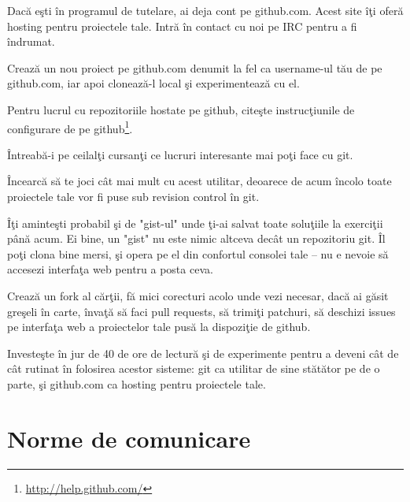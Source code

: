 \begin{Exercise}[title={A taste of git}]
Dacă eşti în programul de tutelare, ai deja cont pe github.com.
Acest site îţi oferă hosting pentru proiectele tale. Intră
în contact cu noi pe IRC pentru a fi îndrumat.

Crează un nou proiect pe github.com denumit la fel ca username-ul
tău de pe github.com, iar apoi clonează-l local şi experimentează
cu el.

Pentru lucrul cu repozitoriile hostate pe github, citeşte instrucţiunile
de configurare de pe github\footnote{\url{http://help.github.com/}}.

Întreabă-i pe ceilalţi cursanţi ce lucruri interesante mai poţi face
cu git.

Încearcă să te joci cât mai mult cu acest utilitar, deoarece de acum
încolo toate proiectele tale vor fi puse sub revision control în git.

Îţi aminteşti probabil şi de "gist-ul" unde ţi-ai salvat toate soluţiile
la exerciţii până acum. Ei bine, un "gist" nu este nimic altceva decât
un repozitoriu git. Îl poţi clona bine mersi, şi opera pe el
din confortul consolei tale -- nu e nevoie să accesezi interfaţa
web pentru a posta ceva.

Crează un fork al cărţii, fă mici corecturi acolo unde vezi necesar,
dacă ai găsit greşeli în carte, învaţă să faci pull
requests, să trimiţi patchuri, să deschizi issues pe interfaţa web
a proiectelor tale pusă la dispoziţie de github.

Investeşte în jur de 40 de ore de lectură şi de experimente pentru
a deveni cât de cât rutinat în folosirea acestor sisteme: git
ca utilitar de sine stătător pe de o parte, şi github.com ca
hosting pentru proiectele tale.
\end{Exercise}




\section{Norme de comunicare}

